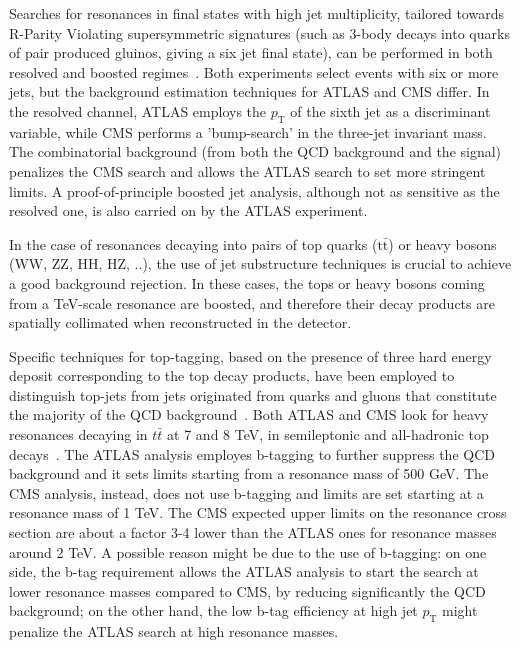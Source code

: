 \documentclass{PoS}
\begin{document}

Searches for resonances in final states with high jet multiplicity, tailored towards R-Parity Violating supersymmetric 
signatures (such as 3-body decays into quarks of pair produced gluinos, giving a six jet final state), can be performed in both resolved and boosted regimes~\cite{Chatrchyan2012329,SUSYRPVATLAS}.
Both experiments select events with six or more jets, but the background estimation techniques 
for ATLAS and CMS differ. In the resolved channel, ATLAS employs the $p_\mathrm{T}$
of the sixth jet as a discriminant variable, while CMS performs a 'bump-search' in the 
three-jet invariant mass. The combinatorial background (from both the QCD background and the signal)
penalizes the CMS search and allows the ATLAS search to set more stringent limits. A proof-of-principle
boosted jet analysis, although not as sensitive as the resolved one, is also carried on by the ATLAS experiment. 
 
In the case of resonances decaying into pairs of top quarks ($\mbox{t}\bar{\mbox{t}}$) or heavy bosons (WW, ZZ, HH, HZ, ..), 
the use of jet substructure techniques is crucial to achieve a good background rejection. 
In these cases, the tops or heavy bosons coming from a TeV-scale resonance 
are boosted, and therefore their decay products are spatially collimated when reconstructed in the detector.  

Specific techniques for top-tagging, based on the presence of three hard energy deposit corresponding
to the top decay products, have been employed to distinguish top-jets from jets originated from quarks and gluons
that constitute the majority of the QCD background~\cite{Kaplan:2008ie, Plehn:2010st, ATLAS-CONF-2012-065, Almeida:2010pa}. 
Both ATLAS and CMS look for heavy resonances decaying in $t\bar{t}$ at 7 and 8 TeV, in semileptonic and all-hadronic top decays~\cite{TtbarResCMS, TtbarResATLAS, CMS-PAS-B2G-12-005, ATLAS-CONF-2013-052, CMS-PAS-B2G-12-006}.
The ATLAS analysis employes b-tagging to further suppress the QCD background and it sets limits starting from a resonance mass of 500 GeV. The CMS analysis, instead, does not use b-tagging and limits are set starting at a resonance mass of 1 TeV. 
The CMS expected upper limits on the resonance cross section are about a factor 3-4 lower than the ATLAS ones for resonance masses around 2 TeV.  A possible reason might be due to the use of b-tagging: on one side, the b-tag requirement allows the ATLAS analysis to start the search at lower resonance masses compared to CMS, by reducing significantly the QCD background; 
on the other hand, the low b-tag efficiency at high jet $ p_\mathrm{T}$ might penalize the ATLAS search at high resonance masses.
\end{document}
